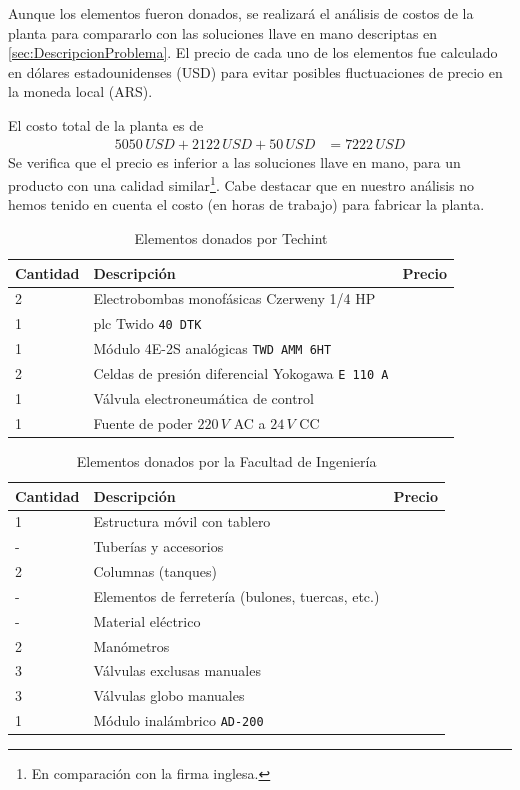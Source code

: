 Aunque los elementos fueron donados, se realizará el análisis de costos de la
planta para compararlo con las soluciones llave en mano descriptas en
\ref{sec:DescripcionProblema}.
El precio de cada uno de los elementos fue calculado en dólares estadounidenses
(USD) para evitar posibles fluctuaciones de precio en la moneda local (ARS).

El costo total de la planta es de
\begin{align}
5050\,USD + 2122\,USD + 50\,USD &= 7222\,USD
\end{align}
Se verifica que el precio es inferior a las soluciones llave en mano, para un
producto con una calidad similar\footnote{En comparación con la firma inglesa.}.
Cabe destacar que en nuestro análisis no hemos tenido en cuenta el costo (en
horas de trabajo) para fabricar la planta.
\begin{table}[!t]
\renewcommand{\arraystretch}{1.3}
\centering
\begin{tabularx}{\textwidth}{l||X||l}
\hline
\bfseries Cantidad & \bfseries Descripción &\bfseries Precio\\
\hline \hline
2& Electrobombas monofásicas Czerweny 1/4 HP &
 {\multirow{6}{*}{5050 USD}}\\
1& \gls{plc} Twido \texttt{40 DTK} &  \\
1& Módulo 4E-2S analógicas \texttt{TWD AMM 6HT}& \\
2& Celdas de presión diferencial Yokogawa \texttt{E 110 A}& \\
1& Válvula electroneumática de control & \\
1& Fuente de poder $220\,V$ AC a $24\,V$ CC& \\
\hline
\end{tabularx}
\caption{Elementos donados por Techint}
\label{tab:donacionTechint}
\end{table}

\begin{table}[!t]
\renewcommand{\arraystretch}{1.3}
\centering
\begin{tabularx}{\textwidth}{l||X||l}
\hline
\bfseries Cantidad & \bfseries Descripción & \bfseries Precio\\
\hline \hline
1& Estructura móvil con tablero&
 {\multirow{9}{*}{2122 USD}}\\
-& Tuberías y accesorios &  \\
2& Columnas (tanques) &  \\
-& Elementos de ferretería (bulones, tuercas, etc.)& \\
-& Material eléctrico &\\
2& Manómetros& \\
3& Válvulas exclusas manuales& \\
3& Válvulas globo manuales& \\
1& Módulo inalámbrico \texttt{AD-200}&\\
\hline
\end{tabularx}
\caption{Elementos donados por la Facultad de Ingeniería}
\label{tab:donacionFing}
\end{table}

